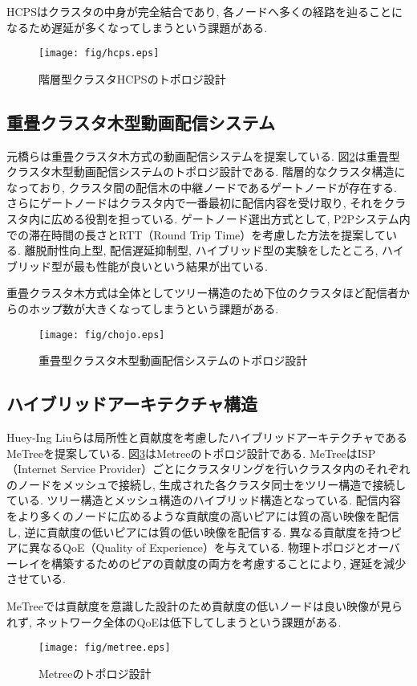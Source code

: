 HCPSはクラスタの中身が完全結合であり, 各ノードへ多くの経路を辿ることになるため遅延が多くなってしまうという課題がある.

\begin{figure}
  \centering
  \texttt{[image: fig/hcps.eps]}
  \caption{階層型クラスタHCPSのトポロジ設計}
  \label{fig:hcps}
\end{figure}

\subsection{重畳クラスタ木型動画配信システム}
元橋らは重畳クラスタ木方式の動画配信システムを提案している\cite{chojo}. 図\ref{fig:chojo}は重畳型クラスタ木型動画配信システムのトポロジ設計である. 階層的なクラスタ構造になっており, クラスタ間の配信木の中継ノードであるゲートノードが存在する. さらにゲートノードはクラスタ内で一番最初に配信内容を受け取り, それをクラスタ内に広める役割を担っている. ゲートノード選出方式として, P2Pシステム内での滞在時間の長さとRTT（Round Trip Time）を考慮した方法を提案している. 離脱耐性向上型, 配信遅延抑制型, ハイブリッド型の実験をしたところ, ハイブリッド型が最も性能が良いという結果が出ている.

重畳クラスタ木方式は全体としてツリー構造のため下位のクラスタほど配信者からのホップ数が大きくなってしまうという課題がある.

\begin{figure}
  \centering
  \texttt{[image: fig/chojo.eps]}
  \caption{重畳型クラスタ木型動画配信システムのトポロジ設計}
  \label{fig:chojo}
\end{figure}

\newpage

\subsection{ハイブリッドアーキテクチャ構造}
Huey-Ing Liuらは局所性と貢献度を考慮したハイブリッドアーキテクチャであるMeTreeを提案している\cite{metree}. 図\ref{fig:metree}はMetreeのトポロジ設計である. MeTreeはISP（Internet Service Provider）ごとにクラスタリングを行いクラスタ内のそれぞれのノードをメッシュで接続し, 生成された各クラスタ同士をツリー構造で接続している. ツリー構造とメッシュ構造のハイブリッド構造となっている. 配信内容をより多くのノードに広めるような貢献度の高いピアには質の高い映像を配信し, 逆に貢献度の低いピアには質の低い映像を配信する. 異なる貢献度を持つピアに異なるQoE（Quality of Experience）を与えている. 物理トポロジとオーバーレイを構築するためのピアの貢献度の両方を考慮することにより, 遅延を減少させている.

MeTreeでは貢献度を意識した設計のため貢献度の低いノードは良い映像が見られず, ネットワーク全体のQoEは低下してしまうという課題がある.

\begin{figure}
  \centering
  \texttt{[image: fig/metree.eps]}
  \caption{Metreeのトポロジ設計}
  \label{fig:metree}
\end{figure}
